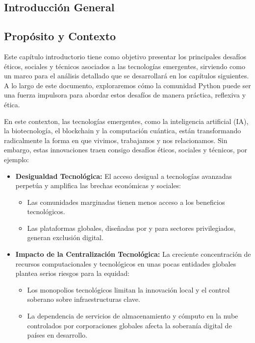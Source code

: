 \begin{refsection}
\chapter{Introducción General}
\label{chapter:introduction_general}

\section{Propósito y Contexto}

Este capítulo introductorio tiene como objetivo presentar los principales desafíos éticos, sociales y técnicos asociados a las tecnologías emergentes, sirviendo como un marco para el análisis detallado que se desarrollará en los capítulos siguientes. A lo largo de este documento, exploraremos cómo la comunidad Python puede ser una fuerza impulsora para abordar estos desafíos de manera práctica, reflexiva y ética.


En este contexton, las tecnologías emergentes, como la inteligencia artificial (IA), la biotecnología, el blockchain y la computación cuántica, están transformando radicalmente la forma en que vivimos, trabajamos y nos relacionamos. Sin embargo, estas innovaciones traen consigo desafíos éticos, sociales y técnicos, por ejemplo:

\begin{itemize} \item \textbf{Desigualdad Tecnológica:}
El acceso desigual a tecnologías avanzadas perpetúa y amplifica las brechas económicas y sociales: \begin{itemize} \item Las comunidades marginadas tienen menos acceso a los beneficios tecnológicos. \item Las plataformas globales, diseñadas por y para sectores privilegiados, generan exclusión digital. \end{itemize}

\item \textbf{Impacto de la Centralización Tecnológica:}  
La creciente concentración de recursos computacionales y tecnológicos en unas pocas entidades globales plantea serios riesgos para la equidad:
\begin{itemize}
    \item Los monopolios tecnológicos limitan la innovación local y el control soberano sobre infraestructuras clave.
    \item La dependencia de servicios de almacenamiento y cómputo en la nube controlados por corporaciones globales afecta la soberanía digital de países en desarrollo.
\end{itemize}


\end{itemize}
\end{refsection}
